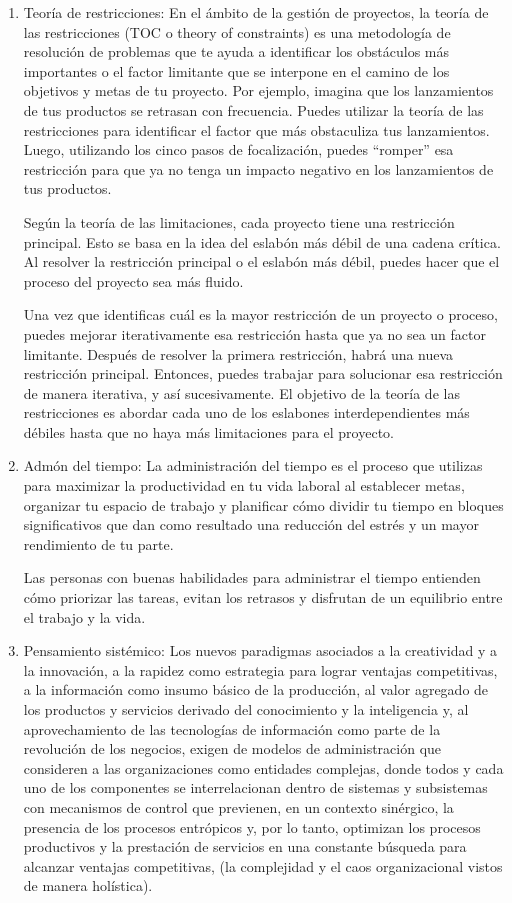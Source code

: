 \documentclass[letterpaper,12pt]{article}
\begin{document}
\begin{sloppypar}
\begin{enumerate}
    \item Teoría de restricciones: En el ámbito de la gestión de proyectos, la teoría de las restricciones (TOC o theory of constraints) es una metodología de resolución de problemas que te ayuda a identificar los obstáculos más importantes o el factor limitante que se interpone en el camino de los objetivos y metas de tu proyecto. Por ejemplo, imagina que los lanzamientos de tus productos se retrasan con frecuencia. Puedes utilizar la teoría de las restricciones para identificar el factor que más obstaculiza tus lanzamientos. Luego, utilizando los cinco pasos de focalización, puedes “romper” esa restricción para que ya no tenga un impacto negativo en los lanzamientos de tus productos.

    Según la teoría de las limitaciones, cada proyecto tiene una restricción principal. Esto se basa en la idea del eslabón más débil de una cadena crítica. Al resolver la restricción principal o el eslabón más débil, puedes hacer que el proceso del proyecto sea más fluido.
    
    Una vez que identificas cuál es la mayor restricción de un proyecto o proceso, puedes mejorar iterativamente esa restricción hasta que ya no sea un factor limitante. Después de resolver la primera restricción, habrá una nueva restricción principal. Entonces, puedes trabajar para solucionar esa restricción de manera iterativa, y así sucesivamente. El objetivo de la teoría de las restricciones es abordar cada uno de los eslabones interdependientes más débiles hasta que no haya más limitaciones para el proyecto.
    
    \item Admón del tiempo: La administración del tiempo es el proceso que utilizas para maximizar la productividad en tu vida laboral al establecer metas, organizar tu espacio de trabajo y planificar cómo dividir tu tiempo en bloques significativos que dan como resultado una reducción del estrés y un mayor rendimiento de tu parte.

    Las personas con buenas habilidades para administrar el tiempo entienden cómo priorizar las tareas, evitan los retrasos y disfrutan de un equilibrio entre el trabajo y la vida.

    \item Pensamiento sistémico: Los nuevos paradigmas asociados a la creatividad y a la innovación, a la rapidez como estrategia para lograr ventajas competitivas, a la información como insumo básico de la producción, al valor agregado de los productos y servicios derivado del conocimiento y la inteligencia y, al aprovechamiento de las tecnologías de información como parte de la revolución de los negocios, exigen de modelos de administración que consideren a las organizaciones como entidades complejas, donde todos y cada uno de los componentes se interrelacionan dentro de sistemas y subsistemas con mecanismos de control que previenen, en un contexto sinérgico, la presencia de los procesos entrópicos y, por lo tanto, optimizan los procesos productivos y la prestación de servicios en una constante búsqueda para alcanzar ventajas competitivas, (la complejidad y el caos organizacional vistos de manera holística).


\end{enumerate}
\end{sloppypar}
\end{document}
